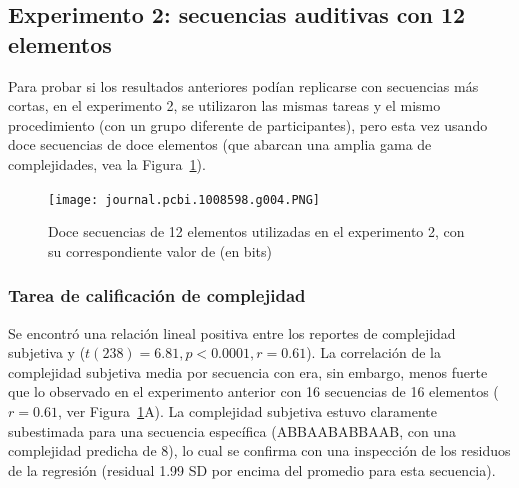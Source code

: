 \subsection{Experimento 2: secuencias auditivas con 12 elementos}
\label{BIN:EXP2:Results}


Para probar si los resultados anteriores podían replicarse con secuencias más cortas, en el experimento 2, se utilizaron las mismas tareas y el mismo procedimiento (con un grupo diferente de participantes), pero esta vez usando doce secuencias de doce elementos (que abarcan una amplia gama de complejidades, vea la Figura~\ref{PlosBIO-F4}).

\begin{figure}[t!]
   \texttt{[image: journal.pcbi.1008598.g004.PNG]}
   \centering
   \caption{Doce secuencias de 12 elementos utilizadas en el experimento 2, con su correspondiente valor de \mdlbin (en bits)}
   \label{PlosBIO-F4}
\end{figure}

\subsubsection*{Tarea de calificación de complejidad}


Se encontró una relación lineal positiva entre los reportes de complejidad subjetiva y \mdlbin ($t(238) = 6.81, p < 0.0001, r = 0.61$). La correlación de la complejidad subjetiva media por secuencia con \mdlbin era, sin embargo, menos fuerte que lo observado en el experimento anterior con 16 secuencias de 16 elementos ($r = 0.61$, ver Figura~\ref{PlosBIO-F4}A). La complejidad subjetiva estuvo claramente subestimada para una secuencia específica (ABBAABABBAAB, con una complejidad predicha de 8), lo cual se confirma con una inspección de los residuos de la regresión (residual 1.99 SD por encima del promedio para esta secuencia).

